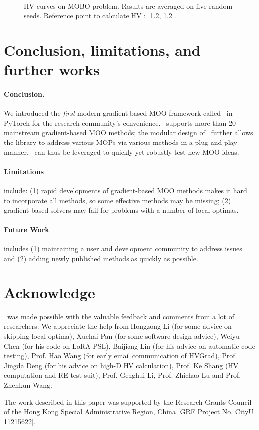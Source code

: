 \begin{figure}%
    \centering%
    \\
    \caption{HV curves on MOBO problem. Results are averaged on five random seeds. Reference point to calculate HV : [1.2, 1.2].} \label{fig:mobo}
\end{figure}

\section{Conclusion, limitations, and further works} \label{sec:conclusion}
\paragraph{Conclusion.}
We introduced the \textit{first} modern gradient-based MOO framework called \algoname~in PyTorch for the research community's convenience. 
\algoname~supports more than 20 mainstream gradient-based MOO methods;
the modular design of \algoname~further allows the library to address various MOPs via various methods in a plug-and-play manner.
\algoname~can thus be leveraged to quickly yet robustly test new MOO ideas.

\paragraph{Limitations} include: (1) rapid developments of gradient-based MOO methods makes it hard to incorporate all methods, so some effective methods may be missing; (2) gradient-based solvers may fail for problems with a number of local optimas. 

\paragraph{Future Work} includes (1) maintaining a user and development community to address issues and (2) adding newly published methods as quickly as possible.

\clearpage
\section*{Acknowledge}
\algoname~was made possible with the valuable feedback and comments from a lot of researchers. We appreciate the help from Hongzong Li (for some advice on skipping local optima), Xuehai Pan (for some software design advice), Weiyu Chen (for his code on LoRA PSL), Baijiong Lin (for his advice on automatic code testing), Prof. Hao Wang (for early email communication of HVGrad), Prof. Jingda Deng (for his advice on high-D HV calculation), Prof. Ke Shang (HV computation and RE test suit), Prof. Genghui Li, Prof. Zhichao Lu and Prof. Zhenkun Wang.

The work described in this paper was supported by the Research Grants Council of the Hong Kong Special Administrative Region, China [GRF Project No. CityU 11215622].

